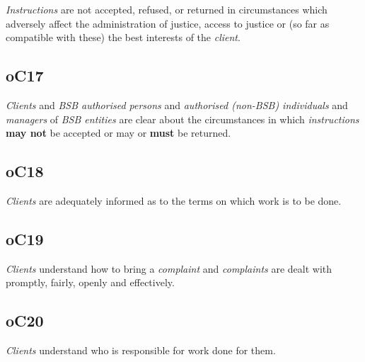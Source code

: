 \emph{Instructions} are not accepted, refused, or returned in
circumstances which adversely affect the administration of justice,
access to justice or (so far as compatible with these) the best
interests of the \emph{client}.

\subsection{\color{bleu}oC17}

\emph{Clients} and \emph{BSB authorised persons} and \emph{authorised
(non-BSB) individuals} and \emph{managers} of \emph{BSB entities} are
clear about the circumstances in which \emph{instructions} \textcolor{myred}{\textbf{may not}} be
accepted or may or \textcolor{myred}{\textbf{must}} be returned.

\subsection{\color{bleu}oC18}

\emph{Clients} are adequately informed as to the terms on which work is
to be done.

\subsection{\color{bleu}oC19}

\emph{Clients} understand how to bring a \emph{complaint} and
\emph{complaints} are dealt with promptly, fairly, openly and
effectively.

\subsection{\color{bleu}oC20}

\emph{Clients} understand who is responsible for work done for them.




